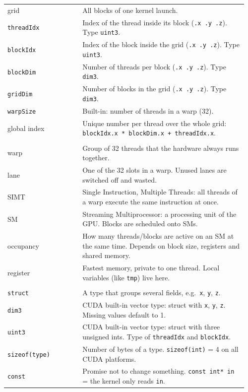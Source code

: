 \documentclass[main.tex]{subfiles}
\begin{document}
\begin{longtable}{@{}p{0.3\linewidth}p{0.66\linewidth}@{}}
grid & All blocks of one kernel launch.\\
\texttt{threadIdx} & Index of the thread inside its block (\texttt{.x .y .z}). Type \texttt{uint3}.\\
\texttt{blockIdx} & Index of the block inside the grid (\texttt{.x .y .z}). Type \texttt{uint3}.\\
\texttt{blockDim} & Number of threads per block (\texttt{.x .y .z}). Type \texttt{dim3}.\\
\texttt{gridDim} & Number of blocks in the grid (\texttt{.x .y .z}). Type \texttt{dim3}.\\
\texttt{warpSize} & Built-in: number of threads in a warp (32).\\
global index & Unique number per thread over the whole grid: \texttt{blockIdx.x * blockDim.x + threadIdx.x}.\\
\noalign{\medskip}
\multicolumn{2}{@{}l}{\textbf{Hardware}}\\
warp & Group of 32 threads that the hardware always runs together.\\
lane & One of the 32 slots in a warp. Unused lanes are switched off and wasted.\\
SIMT & Single Instruction, Multiple Threads: all threads of a warp execute the same instruction at once.\\
SM & Streaming Multiprocessor: a processing unit of the GPU. Blocks are scheduled onto SMs.\\
occupancy & How many threads/blocks are active on an SM at the same time. Depends on block size, registers and shared memory.\\
register & Fastest memory, private to one thread. Local variables (like \texttt{tmp}) live here.\\
\noalign{\medskip}
\multicolumn{2}{@{}l}{\textbf{Types}}\\
\texttt{struct} & A type that groups several fields, e.g.\ \texttt{x}, \texttt{y}, \texttt{z}.\\
\texttt{dim3} & CUDA built-in vector type: struct with \texttt{x}, \texttt{y}, \texttt{z}. Missing values default to 1.\\
\texttt{uint3} & CUDA built-in vector type: struct with three unsigned ints. Type of \texttt{threadIdx} and \texttt{blockIdx}.\\
\texttt{sizeof(type)} & Number of bytes of a type. \texttt{sizeof(int)} = 4 on all CUDA platforms.\\
\texttt{const} & Promise not to change something. \texttt{const int* in} = the kernel only reads \texttt{in}.\\

\end{longtable}
\end{document}
